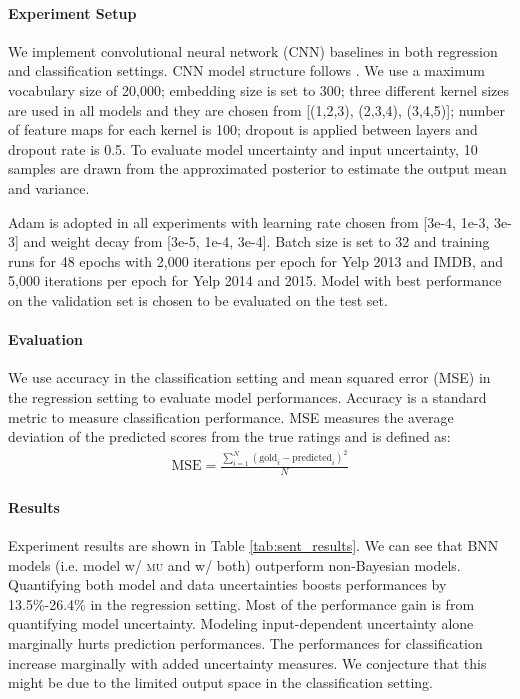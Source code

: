 \documentclass[letterpaper]{article} %
\begin{document}
\paragraph{Experiment Setup} We implement convolutional neural network (CNN) baselines in both regression and classification settings. CNN model structure follows \cite{kim2014convolutional}. We use a maximum vocabulary size of 20,000; embedding size is set to 300; three different kernel sizes are used in all models and they are chosen from [(1,2,3), (2,3,4), (3,4,5)]; number of feature maps for each kernel is 100; dropout \cite{srivastava2014dropout} is applied between layers and dropout rate is 0.5. To evaluate model uncertainty and input uncertainty, 10 samples are drawn from the approximated posterior to estimate the output mean and variance.

Adam \cite{kingma2014adam} is adopted in all experiments with learning rate chosen from [3e-4, 1e-3, 3e-3] and weight decay from [3e-5, 1e-4, 3e-4]. Batch size is set to 32 and training runs for 48 epochs with 2,000 iterations per epoch for Yelp 2013 and IMDB, and 5,000 iterations per epoch for Yelp 2014 and 2015. Model with best performance on the validation set is chosen to be evaluated on the test set.

\paragraph{Evaluation}
We use accuracy in the classification setting and mean squared error (MSE) in the regression setting to evaluate model performances. Accuracy is a standard metric to measure classification performance. MSE measures the average deviation of the predicted scores from the true ratings and is defined as:
\begin{align}
\text{MSE}=\frac{\sum_{i=1}^N(\text{gold}_i-\text{predicted}_i)^2}{N}
\end{align}


\paragraph{Results} Experiment results are shown in Table \ref{tab:sent_results}. We can see that BNN models (i.e. model w/ \textsc{mu} and w/ both) outperform non-Bayesian models. Quantifying both model and data uncertainties boosts performances by 13.5\%-26.4\% in the regression setting. Most of the performance gain is from quantifying model uncertainty. Modeling input-dependent uncertainty alone marginally hurts prediction performances. The performances for classification increase marginally with added uncertainty measures. We conjecture that this might be due to the limited output space in the classification setting.
\end{document}
